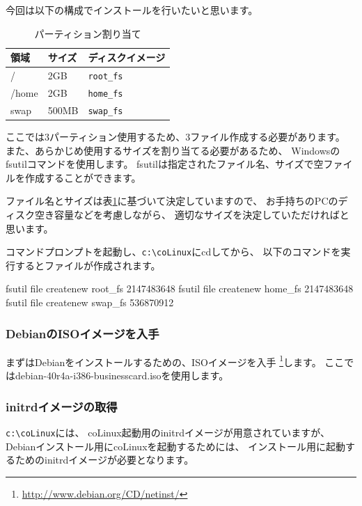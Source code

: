 \documentclass[mingoth,a4paper]{jsarticle}
\begin{document}
今回は以下の構成でインストールを行いたいと思います。
\begin{table}[htbp]
\begin{center}
  \begin{tabular}[htbp]{|l|l|l|}\hline
    領域 & サイズ & ディスクイメージ\\ \hline\hline
    / & 2GB & \verb|root_fs|\\ \hline
    /home & 2GB & \verb|home_fs|\\ \hline
    swap & 500MB & \verb|swap_fs|\\ \hline
  \end{tabular}
  \caption{パーティション割り当て}
  \label{tab:colinux_partition}
\end{center}
\end{table}

ここでは3パーティション使用するため、3ファイル作成する必要があります。
また、あらかじめ使用するサイズを割り当てる必要があるため、
Windowsのfsutilコマンドを使用します。
fsutilは指定されたファイル名、サイズで空ファイルを作成することができます。

ファイル名とサイズは表\ref{tab:colinux_partition}に基づいて決定していますので、
お手持ちのPCのディスク空き容量などを考慮しながら、
適切なサイズを決定していただければと思います。

コマンドプロンプトを起動し、\verb|c:\coLinux|にcdしてから、
以下のコマンドを実行するとファイルが作成されます。

\begin{commandline}
fsutil file createnew root_fs 2147483648
fsutil file createnew home_fs 2147483648
fsutil file createnew swap_fs 536870912
\end{commandline}

\subsubsection{DebianのISOイメージを入手}
まずはDebianをインストールするための、ISOイメージを入手
\footnote{\url{http://www.debian.org/CD/netinst/}}します。
ここではdebian-40r4a-i386-businesscard.isoを使用します。

\subsubsection{initrdイメージの取得}
\verb|c:\coLinux|には、
coLinux起動用のinitrdイメージが用意されていますが、
Debianインストール用にcoLinuxを起動するためには、
インストール用に起動するためのinitrdイメージが必要となります。
\end{document}
